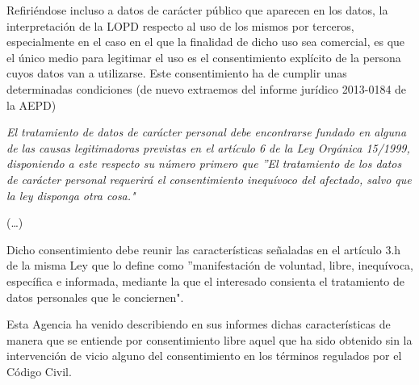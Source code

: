 Refiriéndose incluso a datos de carácter público que aparecen en los datos,
la interpretación de la LOPD respecto al uso de los mismos por terceros, especialmente
en el caso en el que la finalidad de dicho uso sea comercial, es que el único medio
para legitimar el uso es el consentimiento explícito de la persona cuyos datos van 
a utilizarse. Este consentimiento ha de cumplir unas determinadas condiciones
(de nuevo extraemos del informe jurídico  2013-0184 de la AEPD)
\begin{center}
\noindent\begin{minipage}{0.9\linewidth}%
\centering%
{\em 
El tratamiento de datos de carácter personal debe encontrarse fundado
en alguna de las causas legitimadoras previstas en el artículo 6 de la Ley
Orgánica 15/1999, disponiendo a este respecto su número primero que ''El
tratamiento de los datos de carácter personal requerirá el consentimiento
inequívoco del afectado, salvo que la ley disponga otra cosa."

(\dots)

Dicho
consentimiento debe reunir las características señaladas en el
artículo 3.h de la misma Ley que lo define como ''manifestación de
voluntad, libre, inequívoca, específica e informada, mediante la que el
interesado consienta el tratamiento de datos personales que le
conciernen".

Esta Agencia ha venido describiendo en sus informes dichas
características de manera que se entiende por consentimiento libre aquel que
ha sido obtenido sin la intervención de vicio alguno del consentimiento en los
términos regulados por el Código Civil.
}
\end{minipage}
\end{center}




